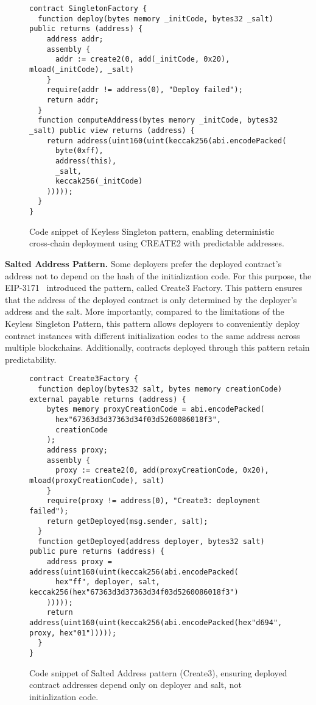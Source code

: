 \documentclass[acmsmall, screen]{acmart}
\begin{document}
	\begin{figure}[h]
		\begin{minipage}{0.95\linewidth}
			\begin{lstlisting}
contract SingletonFactory {
  function deploy(bytes memory _initCode, bytes32 _salt) public returns (address) {
    address addr;
    assembly {
      addr := create2(0, add(_initCode, 0x20), mload(_initCode), _salt)
    }
    require(addr != address(0), "Deploy failed");
    return addr;
  }
  function computeAddress(bytes memory _initCode, bytes32 _salt) public view returns (address) {
    return address(uint160(uint(keccak256(abi.encodePacked(
      byte(0xff),
      address(this),
      _salt,
      keccak256(_initCode)
    )))));
  }
}
			\end{lstlisting}
		\end{minipage}
		\caption{Code snippet of Keyless Singleton pattern, enabling deterministic cross-chain deployment
		using CREATE2 with predictable addresses.}
		\label{list:singleton}
	\end{figure}

	\textbf{Salted Address Pattern.} Some deployers prefer the deployed contract's address not to depend
	on the hash of the initialization code. For this purpose, the EIP-3171~\cite{eip-3171} introduced
	the pattern, called Create3 Factory. This pattern ensures that the address of the deployed contract
	is only determined by the deployer's address and the salt. More importantly, compared to the limitations
	of the Keyless Singleton Pattern, this pattern allows deployers to conveniently deploy contract
	instances with different initialization codes to the same address across multiple blockchains. Additionally,
	contracts deployed through this pattern retain predictability.

	\begin{figure}[h]
		\begin{minipage}{0.95\linewidth}
			\begin{lstlisting}
contract Create3Factory {
  function deploy(bytes32 salt, bytes memory creationCode) external payable returns (address) {
    bytes memory proxyCreationCode = abi.encodePacked(
      hex"67363d3d37363d34f03d5260086018f3",
      creationCode
    );
    address proxy;
    assembly {
      proxy := create2(0, add(proxyCreationCode, 0x20), mload(proxyCreationCode), salt)
    }
    require(proxy != address(0), "Create3: deployment failed");
    return getDeployed(msg.sender, salt);
  }
  function getDeployed(address deployer, bytes32 salt) public pure returns (address) {
    address proxy = address(uint160(uint(keccak256(abi.encodePacked(
      hex"ff", deployer, salt, keccak256(hex"67363d3d37363d34f03d5260086018f3")
    )))));
    return address(uint160(uint(keccak256(abi.encodePacked(hex"d694", proxy, hex"01")))));
  }
}
			\end{lstlisting}
		\end{minipage}
		\caption{Code snippet of Salted Address pattern (Create3), ensuring deployed contract addresses
		depend only on deployer and salt, not initialization code.}
		\label{list:create3}
	\end{figure}
\end{document}
